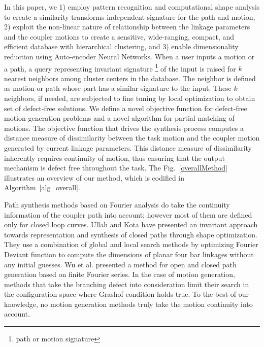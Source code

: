 \documentclass[twocolumn,10pt]{asme2ej}
\begin{document}
In this paper, we 1) employ pattern recognition and computational shape analysis to create a similarity transforms-independent signature for the path and motion, 2) exploit the non-linear nature of relationship between the linkage parameters and the coupler motions to create a sensitive, wide-ranging, compact, and efficient database with hierarchical clustering, and 3) enable dimensionality reduction using Auto-encoder Neural Networks.
When a user inputs a motion or a path, a query representing invariant signature \footnote{path or motion signature} of the input is raised for $k$ nearest neighbors among cluster centers in the database.
The neighbor is defined as motion or path whose part has a similar signature to the input.
These $k$ neighbors, if needed, are subjected to fine tuning by local optimization to obtain set of defect-free solutions.
We define a novel objective function for defect-free motion generation problems and a novel algorithm for partial matching of motions.
The objective function that drives the synthesis process computes a distance measure of dissimilarity between the task motion and the coupler motion generated by current linkage parameters.
This distance measure of dissimilarity inherently requires continuity of motion, thus ensuring that the output mechanism is defect free throughout the task.
The Fig.~\ref{overallMethod} illustrates an overview of our method, which is codified in Algorithm~\ref{alg_overall}.

Path synthesis methods based on Fourier analysis do take the continuity information of the coupler path into account; however most of them are defined only for closed loop curves.
Ullah and Kota\cite{ullah1997} have presented an invariant approach towards representation and synthesis of closed paths through shape optimization. They use a combination of global and local search methods by optimizing Fourier Deviant function to compute the dimensions of planar four bar linkages without any initial guesses.
Wu et al.\cite{wu2011} presented a method for open and closed path generation based on finite Fourier series. In the case of motion generation, methods that take the branching defect into consideration limit their search in the configuration space where Grashof condition holds true. To the best of our knowledge, no motion generation methods truly take the motion continuity into account.
\end{document}
